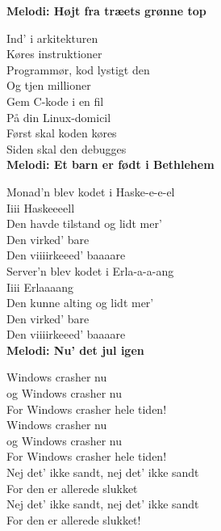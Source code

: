 \vspace{-2.5mm}
\textbf{Melodi: Højt fra træets grønne top}

Ind' i arkitekturen\\
Køres instruktioner\\
Programmør, kod lystigt den\\
Og tjen millioner\\
Gem C-kode i en fil\\
På din Linux-domicil\\
Først skal koden køres\\
Siden skal den debugges\\


\vspace{-2.5mm}
\textbf{Melodi: Et barn er født i Bethlehem}

Monad'n blev kodet i Haske-e-e-el\\
Iiii Haskeeeell\\
Den havde tilstand og lidt mer'\\
Den virked' bare\\
Den viiiirkeeed' baaaare\\
Server'n blev kodet i Erla-a-a-ang\\
Iiii Erlaaaang\\
Den kunne alting og lidt mer'\\
Den virked' bare\\
Den viiiirkeeed' baaaare\\


\vspace{-2.5mm}
\textbf{Melodi: Nu' det jul igen}

Windows crasher nu\\
og Windows crasher nu\\
For Windows crasher hele tiden!\\
Windows crasher nu\\
og Windows crasher nu\\
For Windows crasher hele tiden!\\
Nej det' ikke sandt, nej det' ikke sandt\\
For den er allerede slukket\\
Nej det' ikke sandt, nej det' ikke sandt\\
For den er allerede slukket!
